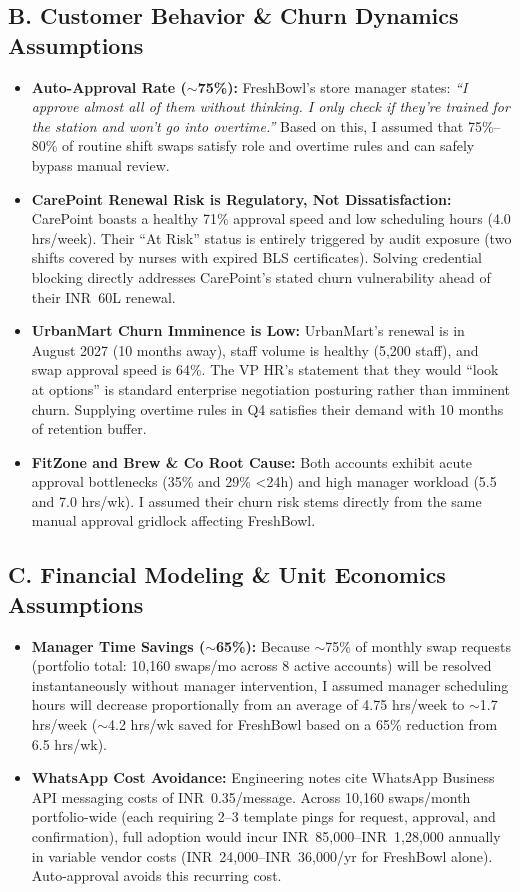 \documentclass[10pt,a4paper]{article}
\newcommand{\INR}{INR~}
\begin{document}
\subsection*{B. Customer Behavior \& Churn Dynamics Assumptions}
\begin{itemize}[itemsep=1pt,topsep=1pt]
    \item \textbf{Auto-Approval Rate ($\sim$75\%):} FreshBowl's store manager states: \textit{``I approve almost all of them without thinking. I only check if they're trained for the station and won't go into overtime.''} Based on this, I assumed that 75\%--80\% of routine shift swaps satisfy role and overtime rules and can safely bypass manual review.
    \item \textbf{CarePoint Renewal Risk is Regulatory, Not Dissatisfaction:} CarePoint boasts a healthy 71\% approval speed and low scheduling hours (4.0 hrs/week). Their ``At Risk'' status is entirely triggered by audit exposure (two shifts covered by nurses with expired BLS certificates). Solving credential blocking directly addresses CarePoint's stated churn vulnerability ahead of their \INR 60L renewal.
    \item \textbf{UrbanMart Churn Imminence is Low:} UrbanMart's renewal is in August 2027 (10 months away), staff volume is healthy (5,200 staff), and swap approval speed is 64\%. The VP HR's statement that they would ``look at options'' is standard enterprise negotiation posturing rather than imminent churn. Supplying overtime rules in Q4 satisfies their demand with 10 months of retention buffer.
    \item \textbf{FitZone and Brew \& Co Root Cause:} Both accounts exhibit acute approval bottlenecks (35\% and 29\% <24h) and high manager workload (5.5 and 7.0 hrs/wk). I assumed their churn risk stems directly from the same manual approval gridlock affecting FreshBowl.
\end{itemize}

\subsection*{C. Financial Modeling \& Unit Economics Assumptions}
\begin{itemize}[itemsep=1pt,topsep=1pt]
    \item \textbf{Manager Time Savings ($\sim$65\%):} Because $\sim$75\% of monthly swap requests (portfolio total: 10,160 swaps/mo across 8 active accounts) will be resolved instantaneously without manager intervention, I assumed manager scheduling hours will decrease proportionally from an average of 4.75 hrs/week to $\sim$1.7 hrs/week ($\sim$4.2 hrs/wk saved for FreshBowl based on a 65\% reduction from 6.5 hrs/wk).
    \item \textbf{WhatsApp Cost Avoidance:} Engineering notes cite WhatsApp Business API messaging costs of \INR 0.35/message. Across 10,160 swaps/month portfolio-wide (each requiring 2--3 template pings for request, approval, and confirmation), full adoption would incur \INR 85,000--\INR 1,28,000 annually in variable vendor costs (\INR 24,000--\INR 36,000/yr for FreshBowl alone). Auto-approval avoids this recurring cost.
\end{itemize}
\end{document}
